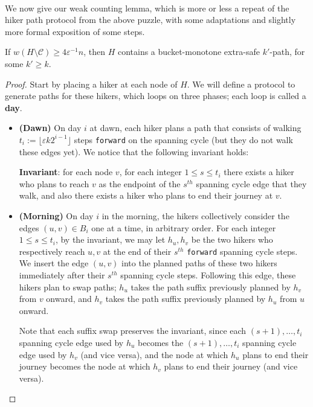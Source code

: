 \documentclass{article}\usepackage[a4paper,margin=20mm]{geometry}
\newcommand{\eps}{\varepsilon}
\newcommand{\cee}{\mathcal{C}}
\newcommand{\forward}{\texttt{forward}}
\begin{document}
~\\We now give our weak counting lemma, which is more or less a repeat of the hiker path protocol from the above puzzle, with some adaptations and slightly more formal exposition of some steps.

\begin{lemma} 
If $w(H \setminus \cee) \ge 4 \eps^{-1} n$, then $H$ contains a bucket-monotone extra-safe $k'$-path, for some $k' \ge k$.
\end{lemma}
\begin{proof}
Start by placing a hiker at each node of $H$.
We will define a protocol to generate paths for these hikers, which loops on three phases; each loop is called a \textbf{day}.

\begin{itemize}
\item \textbf{(Dawn)} On day $i$ at dawn, each hiker plans a path that consists of walking $t_i :=\lfloor \eps k 2^{i-1} \rfloor$ steps \forward{} on the spanning cycle (but they do not walk these edges yet).
We notice that the following invariant holds:
\begin{center}
\textbf{Invariant}: for each node $v$, for each integer $1 \le s \le t_i$ there exists a hiker who plans to reach $v$ as the endpoint of the $s^{th}$ spanning cycle edge that they walk, and also there exists a hiker who plans to end their journey at $v$.
\end{center}

\item \textbf{(Morning)} On day $i$ in the morning, the hikers collectively consider the edges $(u, v) \in B_i$ one at a time, in arbitrary order.
For each integer $1 \le s \le t_i$, by the invariant, we may let $h_{u}, h_{v}$ be the two hikers who respectively reach $u, v$ at the end of their $s^{th}$ \forward{} spanning cycle steps.
We insert the edge $(u, v)$ into the planned paths of these two hikers immediately after their $s^{th}$ spanning cycle steps.
Following this edge, these hikers plan to swap paths; $h_{u}$ takes the path suffix previously planned by $h_{v}$ from $v$ onward, and $h_{v}$ takes the path suffix previously planned by $h_{u}$ from $u$ onward.

Note that each suffix swap preserves the invariant, since each $(s+1), \dots, t_i$ spanning cycle edge used by $h_u$ becomes the $(s+1), \dots, t_i$ spanning cycle edge used by $h_v$ (and vice versa), and the node at which $h_u$ plans to end their journey becomes the node at which $h_v$ plans to end their journey (and vice versa).


\end{itemize}
\end{proof}
\end{document}
